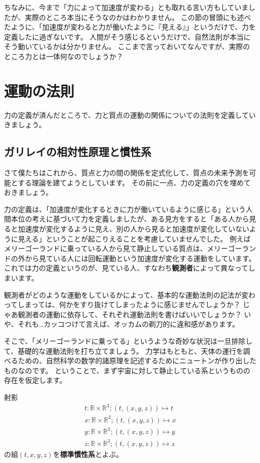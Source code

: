 ちなみに、今まで「力によって加速度が変わる」とも取れる言い方もしていましたが、実際のところ本当にそうなのかはわかりません。
この節の冒頭にも述べたように、「加速度が変わると力が働いたように『見える』」というだけで、力を定義したに過ぎないです。
人間がそう感じるというだけで、自然法則が本当にそう動いているかは分かりません。
ここまで言っておいてなんですが、実際のところ力とは一体何なのでしょうか？



\section{運動の法則}

力の定義が済んだところで、力と質点の運動の関係についての法則を定義していきましょう。

\subsection{ガリレイの相対性原理と慣性系}

さて僕たちはこれから、質点と力の間の関係を定式化して、質点の未来予測を可能とする理論を建てようとしています。
その前に一点、力の定義の穴を埋めておきましょう。

力の定義は、「加速度が変化するときに力が働いているように感じる」という人間本位の考えに基づいて力を定義しましたが、ある見方をすると「ある人から見ると加速度が変化するように見え、別の人から見ると加速度が変化していないように見える」ということが起こりえることを考慮していませんでした。
例えばメリーゴーランドに乗っている人から見て静止している質点は、メリーゴーランドの外から見ている人には回転運動という加速度が変化する運動をしています。
これでは力の定義というのが、見ている人、すなわち\textbf{観測者}によって異なってしまいます。

観測者がどのような運動をしているかによって、基本的な運動法則の記法が変わってしまっては、何かをすり抜けてしまったように感じませんでしょうか？
じゃあ観測者の運動に依存して、それぞれ運動法則を書けばいいでしょうか？
いや、それも…カッコつけて言えば、オッカムの剃刀的に違和感があります。

そこで、「メリーゴーランドに乗ってる」というような奇妙な状況は一旦排除して、基礎的な運動法則を打ち立てましょう。
力学はもともと、天体の運行を調べるための、自然科学の数学的諸原理を記述するためにニュートンが作り出したものなのです。
ということで、まず宇宙に対して静止している系というものの存在を仮定します。
\begin{definition}
  射影
  \begin{align*}
    t:\mathbb{R}\times\mathbb{R}^3;(t,(x,y,z))\mapsto t\\
    x:\mathbb{R}\times\mathbb{R}^3;(t,(x,y,z))\mapsto x\\
    y:\mathbb{R}\times\mathbb{R}^3;(t,(x,y,z))\mapsto y\\
    z:\mathbb{R}\times\mathbb{R}^3;(t,(x,y,z))\mapsto z
  \end{align*}
  の組$(t,x,y,z)$を\textbf{標準慣性系}とよぶ。
\end{definition}

